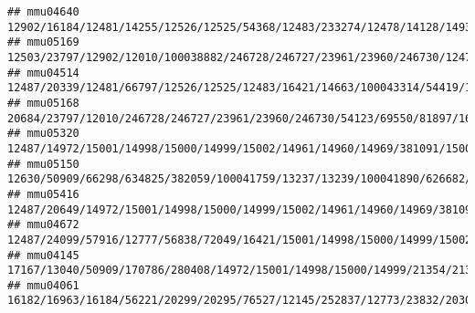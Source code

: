 \documentclass[
]{article}
\begin{document}
\begin{verbatim}
## mmu04640                                                                                                   12902/16184/12481/14255/12526/12525/54368/12483/233274/12478/14128/14934/12502/12500/12501/15001/14998/15000/14999/15002/14961/14960/14969/381091/12475/12507/12482
## mmu05169 12503/23797/12902/12010/100038882/246728/246727/23961/23960/246730/12478/54123/14128/12502/12500/12501/14972/15001/14998/15000/14999/21354/21355/15002/14961/14960/14969/381091/15006/15013/15015/110557/15018/110558/15039/100529082/15024/630294/667977/14990/12229
## mmu04514                                  12487/20339/12481/66797/12526/12525/12483/16421/14663/100043314/54419/14972/15001/14998/15000/14999/15002/14961/14960/14969/381091/15006/15013/15015/110557/15018/110558/15039/100529082/15024/630294/667977/14990/12511/60533/58205
## mmu05168                20684/23797/12010/246728/246727/23961/23960/246730/54123/69550/81897/16160/20304/14972/15001/14998/15000/14999/21354/21355/15002/14961/14960/14969/381091/15006/15013/15015/110557/15018/110558/15039/100529082/15024/630294/667977/14990/16149/170722
## mmu05320                                                                                                                    12487/14972/15001/14998/15000/14999/15002/14961/14960/14969/381091/15006/15013/15015/110557/15018/110558/15039/100529082/15024/630294/667977/14990
## mmu05150                                                                       12630/50909/66298/634825/382059/100041759/13237/13239/100041890/626682/626708/100041952/503491/16672/16663/16664/16666/14293/15001/14998/15000/14999/15002/14961/14960/14969/381091/12268/12263
## mmu05416                                                                                                        12487/20649/14972/15001/14998/15000/14999/15002/14961/14960/14969/381091/15006/15013/15015/110557/15018/110558/15039/100529082/15024/630294/667977/14990/13527
## mmu04672                                                                                                                                                                      12487/24099/57916/12777/56838/72049/16421/15001/14998/15000/14999/15002/14961/14960/14969/381091
## mmu04145                                                                  17167/13040/50909/170786/280408/14972/15001/14998/15000/14999/21354/21355/15002/14961/14960/14969/381091/15006/15013/15015/110557/15018/110558/15039/100529082/15024/630294/667977/14990/22153/12475
## mmu04061                                                                                                                                  16182/16963/16184/56221/20299/20295/76527/12145/252837/12773/23832/20306/20307/20304/20303/12775/12777/56838/16185/12458/16186/12766

\end{verbatim}
\end{document}
